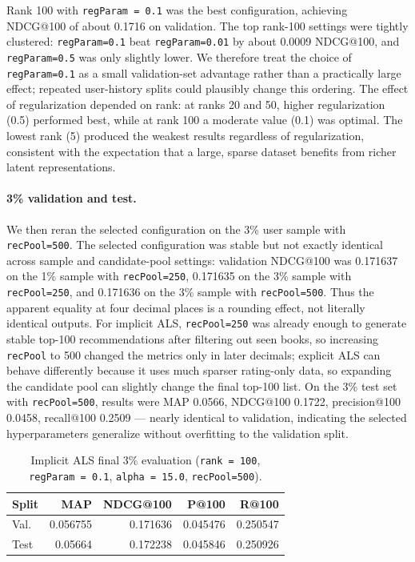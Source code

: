 \documentclass[10pt,twocolumn]{article}
\begin{document}
Rank 100 with \texttt{regParam = 0.1} was the best configuration, achieving NDCG@100 of about 0.1716 on validation. The top rank-100 settings were tightly clustered: \texttt{regParam=0.1} beat \texttt{regParam=0.01} by about 0.0009 NDCG@100, and \texttt{regParam=0.5} was only slightly lower. We therefore treat the choice of \texttt{regParam=0.1} as a small validation-set advantage rather than a practically large effect; repeated user-history splits could plausibly change this ordering. The effect of regularization depended on rank: at ranks 20 and 50, higher regularization (0.5) performed best, while at rank 100 a moderate value (0.1) was optimal. The lowest rank (5) produced the weakest results regardless of regularization, consistent with the expectation that a large, sparse dataset benefits from richer latent representations.

\paragraph{3\% validation and test.} We then reran the selected configuration on the 3\% user sample with \texttt{recPool=500}. The selected configuration was stable but not exactly identical across sample and candidate-pool settings: validation NDCG@100 was 0.171637 on the 1\% sample with \texttt{recPool=250}, 0.171635 on the 3\% sample with \texttt{recPool=250}, and 0.171636 on the 3\% sample with \texttt{recPool=500}. Thus the apparent equality at four decimal places is a rounding effect, not literally identical outputs. For implicit ALS, \texttt{recPool=250} was already enough to generate stable top-100 recommendations after filtering out seen books, so increasing \texttt{recPool} to 500 changed the metrics only in later decimals; explicit ALS can behave differently because it uses much sparser rating-only data, so expanding the candidate pool can slightly change the final top-100 list. On the 3\% test set with \texttt{recPool=500}, results were MAP 0.0566, NDCG@100 0.1722, precision@100 0.0458, recall@100 0.2509 --- nearly identical to validation, indicating the selected hyperparameters generalize without overfitting to the validation split.

\begin{table}[!ht]
\centering
\caption{Implicit ALS final 3\% evaluation (\texttt{rank = 100}, \texttt{regParam = 0.1}, \texttt{alpha = 15.0}, \texttt{recPool=500}).}
\label{tab:implicit-final}
\footnotesize
\setlength{\tabcolsep}{3pt}
\begin{tabular}{l r r r r}
\toprule
\textbf{Split} & \textbf{MAP} & \textbf{NDCG@100} & \textbf{P@100} & \textbf{R@100} \\
\midrule
Val.  & 0.056755 & 0.171636 & 0.045476 & 0.250547 \\
Test  & 0.05664 & 0.172238 & 0.045846 & 0.250926 \\
\bottomrule
\end{tabular}
\end{table}
\end{document}
